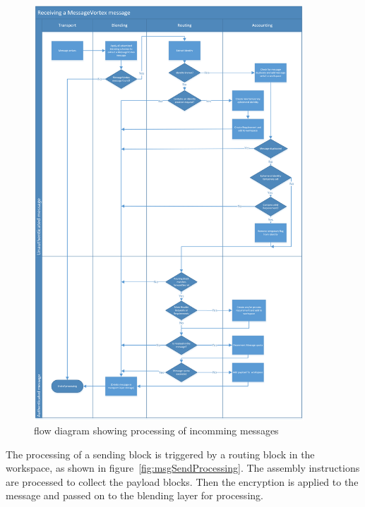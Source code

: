 \begin{figure}[hbt]
	\includegraphics[width=0.90\textwidth]{inc/flowchart_message_receiving}
	\caption{flow diagram showing processing of incomming messages}
	\label{fig:msgRecvProcessing}
\end{figure}

The processing of a sending block is triggered by a routing block in the workspace, as shown in figure~\ref{fig:msgSendProcessing}. The assembly instructions are processed to collect the payload blocks. Then the encryption is applied to the message and passed on to the blending layer for processing.

